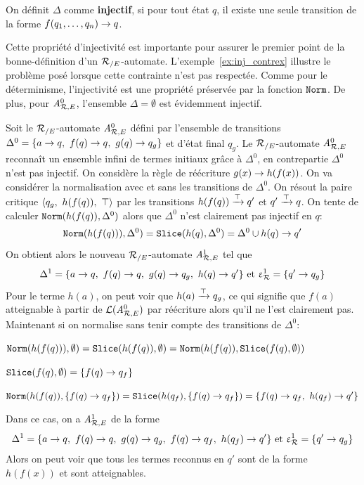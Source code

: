 \begin{definition}
  On définit $\Delta$ comme \textbf{injectif}, si pour tout état $q$,
  il existe une seule transition de la forme $f(q_1, \dots, q_n) \rightarrow q$.
\end{definition}
Cette propriété d'injectivité est importante pour assurer le premier point de la bonne-définition
d'un ${\mathcal R_{/E}}$-automate. L'exemple~\ref{ex:inj_contrex} illustre le problème posé
lorsque cette contrainte n'est pas respectée. Comme pour le déterminisme, l'injectivité
est une propriété préservée par la fonction $\mathtt{Norm}$. De plus, pour ${\mathit A}_{\mathcal R,E}^0$, l'ensemble $\Delta = \emptyset$
est évidemment injectif.

\begin{example}
  \label{ex:inj_contrex}
  Soit le ${\mathcal R_{/E}}$-automate ${\mathit A}_{\mathcal R,E}^0$ défini par l'ensemble de transitions
  $\Delta^0 = \{ a \rightarrow q,\ f(q)\rightarrow q,\ g(q) \rightarrow q_g\}$ et d'état final $q_g$.
  Le ${\mathcal R_{/E}}$-automate ${\mathit A}_{\mathcal R,E}^0$ reconnaît un ensemble infini de termes initiaux grâce à $\Delta^0$,
  en contrepartie $\Delta^0$ n'est pas injectif.
  On considère la règle de réécriture $g(x) \rightarrow h(f(x))$. On va considérer la normalisation 
  avec et sans les transitions de $\Delta^0$. On résout la paire critique $\la q_g,\ h(f(q)),\ \top\ra$ 
  par les transitions $h(f(q)) \xrightarrow{\top} q'$ et $q'\xrightarrow{\top} q$. On tente de calculer $\mathtt{Norm}(h(f(q)),\Delta^0)$ 
  alors que $\Delta^0$ n'est clairement pas injectif en $q$:
  \[\mathtt{Norm}(h(f(q))),\Delta^0) = \mathtt{Slice}(h(q),\Delta^0) = \Delta^0 \cup h(q) \rightarrow q'\]
  On obtient alors le nouveau ${\mathcal R_{/E}}$-automate ${\mathit A}_{\mathcal R,E}^1$ tel que 
  \[\Delta^1 = \{a \rw q,\ f(q)\rw q,\ g(q) \rw q_g,\ h(q) \rw q'\}\textrm{ et } \Drw^1= \{ q' \rw q_g\}\]
  Pour le terme $h(a)$, on peut voir que $h(a) \xrightarrow{\top} q_g$, ce qui signifie que $f(a)$ atteignable à partir de
  $\mathcal{L}({\mathit A}_{\mathcal R,E}^0)$ par réécriture alors qu'il ne l'est clairement pas. Maintenant si on normalise sans tenir
  compte des transitions de $\Delta^0$:
  \begin{description}
  \item $\mathtt{Norm}(h(f(q))),\emptyset) = \mathtt{Slice}(h(f(q)),\emptyset) = \mathtt{Norm}(h(f(q)), \mathtt{Slice}(f(q),\emptyset))$
  \item $\mathtt{Slice}(f(q),\emptyset) = \{f(q) \rightarrow q_f\}$
  \item $\mathtt{Norm}(h(f(q)), \{f(q) \rightarrow q_f\}) = \mathtt{Slice}(h(q_f), \{f(q) \rightarrow q_f\}) = \{f(q) \rightarrow q_f,\ h(q_f) \rightarrow q'\}$
  \end{description}
  Dans ce cas, on a ${\mathit A}_{\mathcal R,E}^1$ de la forme 
  \[\Delta^1 = \{a \rw q,\ f(q)\rw q,\ g(q) \rw q_g,\ f(q) \rw q_f,\ h(q_f) \rw q'\}
  \textrm{ et } \Drw^1= \{ q' \rw q_g\}\]
  Alors on peut voir que tous les termes reconnus en $q'$ sont de la forme $h(f(x))$ et sont atteignables.
\end{example}

